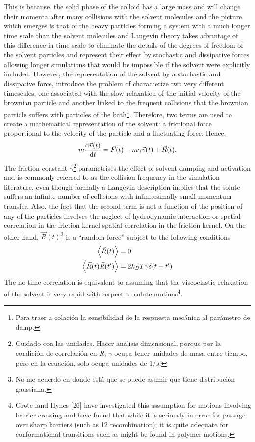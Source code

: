 This is because, the solid phase of the colloid has a large mass and will change their momenta after many collisions with the solvent molecules and the picture which emerges is that of the heavy particles forming a system with a much longer time scale than the solvent molecules\citep{Thijssen2007} and Langevin theory takes advantage of this difference in time scale to eliminate the details of the degrees of freedom of the solvent particles and represent their effect by stochastic and dissipative forces allowing longer simulations that would be impossible if the solvent were explicitly included\citep{pastorTechniquesApplicationsLangevin1994}.
However, the representation of the solvent by a stochastic and dissipative force, introduce the problem of characterize two very different timescales, one associated with the slow relaxation of the initial velocity of the brownian particle and another linked to the frequent collisions that the brownian particle suffers with particles of the bath\citep{tsl2006}\footnote{Para traer a colación la sensibilidad de la respuesta mecánica al parámetro de damp.}. 
Therefore, two terms are used to create a mathematical representation of the solvent: a frictional force proportional to the velocity of the particle and a fluctuating force. 
Hence,
\begin{gather}
    m\dv{\vec{v}(t)}{t}=\vec{F}(t)-m\gamma\vec{v}(t)+\vec{R}(t).\label{eqn:BrownianDyn1}
\end{gather}
The friction constant $\gamma$\footnote{Cuidado con las unidades. Hacer análisis dimensional, porque por la condición de correlación en $R$, $\gamma$ ocupa tener unidades de masa entre tiempo, pero en la ecuación, solo ocupa unidades de $1/s$.} parametrises the effect of solvent damping and activation and is commonly referred to as the collision frequency in the simulation literature, even though formally a Langevin description implies that the solute suffers an infinite number of collisions with infinitesimally small momentum transfer.
Also, the fact that the second term is not a function of the position of any of the particles involves the neglect of hydrodynamic interaction or spatial correlation in the friction kernel spatial correlation in the friction kernel\citep{pastorTechniquesApplicationsLangevin1994}.
On the other hand, $\vec{R}(t)$\footnote{No me acuerdo en donde está que se puede asumir que tiene distribución gaussiana.} is a ``random force'' subject to the following conditions
\begin{align*}
    \expval{\vec{R}(t)} &= 0 \\
    \expval{\vec{R}(t)\vec{R}(t')} &= 2k_{B}T\gamma\delta\qty(t-t') 
\end{align*}
The no time correlation is equivalent to assuming that the viscoelastic relaxation of the solvent is very rapid with respect to solute motions\footnote{Grote land Hynes [26] have investigated this assumption for motions involving barrier crossing and have found that while it is seriously in error for passage over sharp barriers (such as 12 recombination); it is quite adequate for conformational transitions such as might be found in polymer motions.\citep{pastorTechniquesApplicationsLangevin1994}}.

